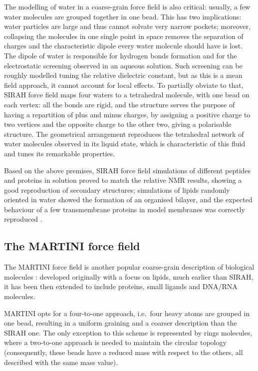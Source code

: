 The modelling of water in a coarse-grain force field is also critical: usually, a few water molecules are grouped together in one bead. This has two implications: water particles are large and thus cannot solvate very narrow pockets; moreover, collapsing the molecules in one single point in space removes the separation of charges and the characteristic dipole every water molecule should have is lost. The dipole of water is responsible for hydrogen bonds formation and for the electrostatic screening observed in an aqueous solution. Such screening can be roughly modelled tuning the relative dielectric constant, but as this is a mean field approach, it cannot account for local effects.
%
To partially obviate to that, SIRAH force field maps four waters to a tetrahedral molecule, with one bead on each vertex: all the bonds are rigid, and the structure serves the purpose of having a repartition of plus and minus charges, by assigning a positive charge to two vertices and the opposite charge to the other two, giving a polarisable structure. The geometrical arrangement reproduces the tetrahedral network of water molecules observed in its liquid state, which is characteristic of this fluid and tunes its remarkable properties.

Based on the above premises, SIRAH force field simulations of different peptides and proteins in solution proved to match the relative NMR results, showing a good reproduction of secondary structures; simulations of lipids randomly oriented in water showed the formation of an organised bilayer, and the expected behaviour of a few transmembrane proteins in model membranes was correctly reproduced \cite{Machado2018,Barrera2019}.

 
\subsection{The MARTINI force field}
The MARTINI force field is another popular coarse-grain description of biological molecules \cite{Marrink2007,Monticelli2008,DeJong2013}: developed originally with a focus on lipids, much earlier than SIRAH, it has been then extended to include proteins, small ligands and DNA/RNA molecules.

MARTINI opts for a four-to-one approach, i.e.\ four heavy atoms are grouped in one bead, resulting in a uniform graining and a coarser description than the SIRAH one. The only exception to this scheme is represented by rings molecules, where a two-to-one approach is needed to maintain the circular topology (consequently, these beads have a reduced mass with respect to the others, all described with the same mass value).

